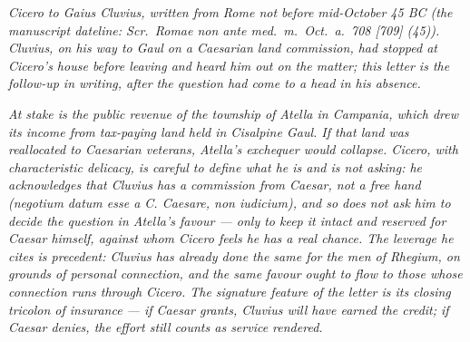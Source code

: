
\textit{Cicero to Gaius Cluvius, written from Rome not
before mid-October 45 BC (the manuscript dateline:
\textit{Scr.\ Romae non ante med.\ m.\ Oct.\ a.\ 708
[709] (45)}). Cluvius, on his way to Gaul on a Caesarian
land commission, had stopped at Cicero's house before
leaving and heard him out on the matter; this letter is
the follow-up in writing, after the question had come to
a head in his absence.}

\textit{At stake is the public revenue of the township of
Atella in Campania, which drew its income from
tax-paying land held in Cisalpine Gaul. If that land was
reallocated to Caesarian veterans, Atella's exchequer
would collapse. Cicero, with characteristic delicacy, is
careful to define what he is and is not asking: he
acknowledges that Cluvius has a commission from Caesar,
not a free hand (\textit{negotium datum esse a C.
Caesare, non iudicium}), and so does not ask him to
decide the question in Atella's favour --- only to keep
it intact and reserved for Caesar himself, against whom
Cicero feels he has a real chance. The leverage he cites
is precedent: Cluvius has already done the same for the
men of Rhegium, on grounds of personal connection, and
the same favour ought to flow to those whose connection
runs through Cicero. The signature feature of the letter
is its closing tricolon of insurance --- if Caesar
grants, Cluvius will have earned the credit; if Caesar
denies, the effort still counts as service rendered.}
